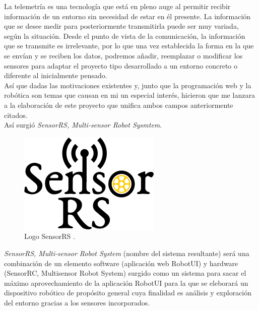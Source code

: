 La telemetría es una tecnología que está en pleno auge al permitir recibir información de un entorno sin necesidad de estar en él presente. 
La información que se desee medir para posteriormente transmitirla puede ser muy variada, según la situación. Desde el punto de vista de la comunicación, la información que se 
transmite es irrelevante, por lo que una vez establecida la forma en la que se envían y se reciben los datos, podremos añadir, reemplazar o modificar los sensores para adaptar el
proyecto tipo desarrollado a un entorno concreto o diferente al inicialmente pensado.\\

Así que dadas las motivaciones existentes y, junto que la programación web y la robótica son temas que causan en mi un especial interés, hicieron que me lanzara a la elaboración de este
proyecto que unifica ambos campos anteriormente citados.\\

Así surgió \emph{SensorRS, Multi-sensor Robot Sysmtem}.\\

\begin{figure}[H]
  \begin{center}
    \includegraphics[scale=0.8]{imagenes/logotipo_sensor_rs.png}
  \end{center}
  \label{fig:logo}
 \caption{Logo SensorRS \protect\footnotemark.}
\end{figure}


\emph{SensorRS, Multi-sensor Robot System} (nombre del sistema resultante) será una combinación de un elemento software (aplicación web RobotUI) y hardware (SensorRC, Multisensor
Robot System) surgido como un sistema para sacar el máximo aprovechamiento de la aplicación RobotUI para la que se eleborará un dispositivo robótico de propósito general cuya finalidad es
análisis y exploración del entorno gracias a los sensores incorporados.\\

